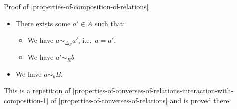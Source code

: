 \begin{Proof}{Proof of \cref{properties-of-composition-of-relations}}
\begin{itemize}
            \begin{itemize}
                \item There exists some $a'\in A$ such that:
                    \begin{itemize}
                        \item We have $a\sim_{\Delta_{B}}a'$, i.e.\ $a=a'$.
                        \item We have $a'\sim_{R}b$
                    \end{itemize}
                \item We have $a\sim_{b}B$.
            \end{itemize}
    \end{itemize}

    This is a repetition of \cref{properties-of-converses-of-relations-interaction-with-composition-1} of \cref{properties-of-converses-of-relations} and is proved there.


\end{Proof}
